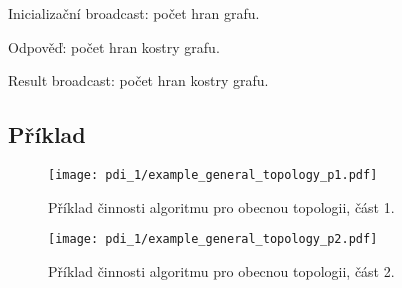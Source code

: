 \begin{compactitem}
    \item Inicializační broadcast: počet hran grafu.
    \item Odpověď: počet hran kostry grafu.
    \item Result broadcast: počet hran kostry grafu.
\end{compactitem}

\subsection*{Příklad}

\begin{figure}[H]
    \centering
    \texttt{[image: pdi\_1/example\_general\_topology\_p1.pdf]}
    \caption{Příklad činnosti algoritmu pro obecnou topologii, část 1.}
\end{figure}

\begin{figure}[H]
    \centering
    \texttt{[image: pdi\_1/example\_general\_topology\_p2.pdf]}
    \caption{Příklad činnosti algoritmu pro obecnou topologii, část 2.}
\end{figure}
